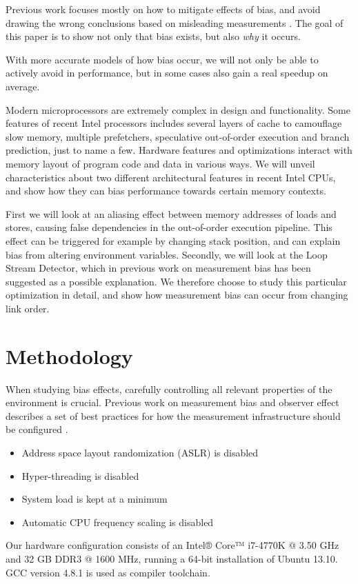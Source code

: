 \documentclass[a4paper,11pt,twocolumn,twoside]{article}
\begin{document}
Previous work focuses mostly on how to mitigate effects of bias, and avoid drawing the wrong conclusions based on misleading measurements \cite{Mytkowicz:2008:Easy, Mytkowicz:2009:WrongData}.
The goal of this paper is to show not only that bias exists, but also \emph{why} it occurs. 

With more accurate models of how bias occur, we will not only be able to actively avoid in performance, but in some cases also gain a real speedup on average.

Modern microprocessors are extremely complex in design and functionality. 
Some features of recent Intel processors includes several layers of cache to camouflage slow memory, multiple prefetchers, speculative out-of-order execution and branch prediction, just to name a few.
Hardware features and optimizations interact with memory layout of program code and data in various ways.
We will unveil characteristics about two different architectural features in recent Intel CPUs, and show how they can bias performance towards certain memory contexts. 

First we will look at an aliasing effect between memory addresses of loads and stores, causing false dependencies in the out-of-order execution pipeline. 
This effect can be triggered for example by changing stack position, and can explain bias from altering environment variables. 
Secondly, we will look at the Loop Stream Detector, which in previous work on measurement bias has been suggested as a possible explanation.
We therefore choose to study this particular optimization in detail, and show how measurement bias can occur from changing link order.


\section{Methodology}
When studying bias effects, carefully controlling all relevant properties of the environment is crucial. 
Previous work on measurement bias and observer effect describes a set of best practices for how the measurement infrastructure should be configured \cite{Mytkowicz:2009:WrongData, Mytkowicz:2008:OE&MB}. 
\begin{itemize}
  \item Address space layout randomization (ASLR) is disabled
  \item Hyper-threading is disabled
  \item System load is kept at a minimum
  \item Automatic CPU frequency scaling is disabled
\end{itemize}
Our hardware configuration consists of an Intel® Core™ i7-4770K @ 3.50 GHz and 32 GB DDR3 @ 1600 MHz, running a 64-bit installation of Ubuntu 13.10. GCC version 4.8.1 is used as compiler toolchain.
\end{document}
